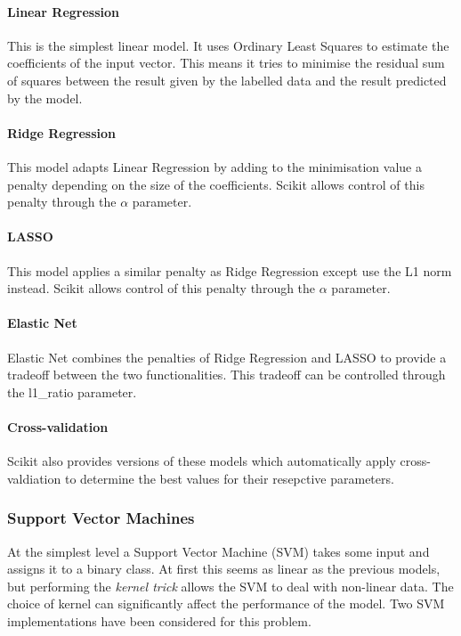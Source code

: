 \paragraph*{Linear Regression}
This is the simplest linear model. It uses Ordinary Least Squares to estimate the coefficients of the input vector. This means it tries to minimise the residual sum of squares between the result given by the labelled data and the result predicted by the model.

\paragraph*{Ridge Regression}
This model adapts Linear Regression by adding to the minimisation value a penalty depending on the size of the coefficients. Scikit allows control of this penalty through the $\alpha$ parameter.

\paragraph*{LASSO}
This model applies a similar penalty as Ridge Regression except use the L1 norm instead. Scikit allows control of this penalty through the $\alpha$ parameter.

\paragraph*{Elastic Net}
Elastic Net combines the penalties of Ridge Regression and LASSO to provide a tradeoff between the two functionalities. This tradeoff can be controlled through the l1\_ratio parameter.

\paragraph*{Cross-validation}
Scikit also provides versions of these models which automatically apply cross-valdiation to determine the best values for their resepctive parameters.

\subsubsection{Support Vector Machines}
At the simplest level a Support Vector Machine (SVM) takes some input and assigns it to a binary class. At first this seems as linear as the previous models, but performing the {\it kernel trick} allows the SVM to deal with non-linear data. The choice of kernel can significantly affect the performance of the model. Two SVM implementations have been considered for this problem.

